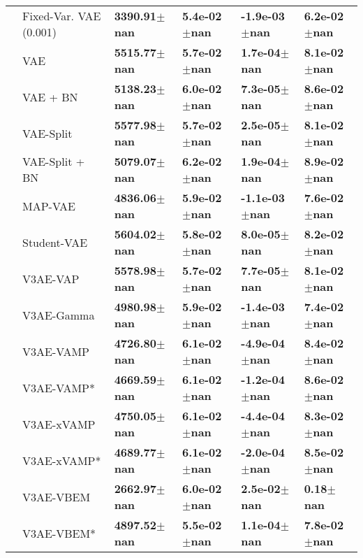 \begin{tabular}{llllll}
             & Fixed-Var. VAE (0.001) &     \textbf{3390.91$\pm$nan} &      \textbf{5.4e-02$\pm$nan} &     \textbf{-1.9e-03$\pm$nan} &      \textbf{6.2e-02$\pm$nan} \\
             & VAE &     \textbf{5515.77$\pm$nan} &      \textbf{5.7e-02$\pm$nan} &      \textbf{1.7e-04$\pm$nan} &      \textbf{8.1e-02$\pm$nan} \\
             & VAE + BN &     \textbf{5138.23$\pm$nan} &      \textbf{6.0e-02$\pm$nan} &      \textbf{7.3e-05$\pm$nan} &      \textbf{8.6e-02$\pm$nan} \\
             & VAE-Split &     \textbf{5577.98$\pm$nan} &      \textbf{5.7e-02$\pm$nan} &      \textbf{2.5e-05$\pm$nan} &      \textbf{8.1e-02$\pm$nan} \\
             & VAE-Split + BN &     \textbf{5079.07$\pm$nan} &      \textbf{6.2e-02$\pm$nan} &      \textbf{1.9e-04$\pm$nan} &      \textbf{8.9e-02$\pm$nan} \\
             & MAP-VAE &     \textbf{4836.06$\pm$nan} &      \textbf{5.9e-02$\pm$nan} &     \textbf{-1.1e-03$\pm$nan} &      \textbf{7.6e-02$\pm$nan} \\
             & Student-VAE &     \textbf{5604.02$\pm$nan} &      \textbf{5.8e-02$\pm$nan} &      \textbf{8.0e-05$\pm$nan} &      \textbf{8.2e-02$\pm$nan} \\
             & V3AE-VAP &     \textbf{5578.98$\pm$nan} &      \textbf{5.7e-02$\pm$nan} &      \textbf{7.7e-05$\pm$nan} &      \textbf{8.1e-02$\pm$nan} \\
             & V3AE-Gamma &     \textbf{4980.98$\pm$nan} &      \textbf{5.9e-02$\pm$nan} &     \textbf{-1.4e-03$\pm$nan} &      \textbf{7.4e-02$\pm$nan} \\
             & V3AE-VAMP &     \textbf{4726.80$\pm$nan} &      \textbf{6.1e-02$\pm$nan} &     \textbf{-4.9e-04$\pm$nan} &      \textbf{8.4e-02$\pm$nan} \\
             & V3AE-VAMP* &     \textbf{4669.59$\pm$nan} &      \textbf{6.1e-02$\pm$nan} &     \textbf{-1.2e-04$\pm$nan} &      \textbf{8.6e-02$\pm$nan} \\
             & V3AE-xVAMP &     \textbf{4750.05$\pm$nan} &      \textbf{6.1e-02$\pm$nan} &     \textbf{-4.4e-04$\pm$nan} &      \textbf{8.3e-02$\pm$nan} \\
             & V3AE-xVAMP* &     \textbf{4689.77$\pm$nan} &      \textbf{6.1e-02$\pm$nan} &     \textbf{-2.0e-04$\pm$nan} &      \textbf{8.5e-02$\pm$nan} \\
             & V3AE-VBEM &     \textbf{2662.97$\pm$nan} &      \textbf{6.0e-02$\pm$nan} &      \textbf{2.5e-02$\pm$nan} &         \textbf{0.18$\pm$nan} \\
             & V3AE-VBEM* &     \textbf{4897.52$\pm$nan} &      \textbf{5.5e-02$\pm$nan} &      \textbf{1.1e-04$\pm$nan} &      \textbf{7.8e-02$\pm$nan} \\
\bottomrule
\end{tabular}

